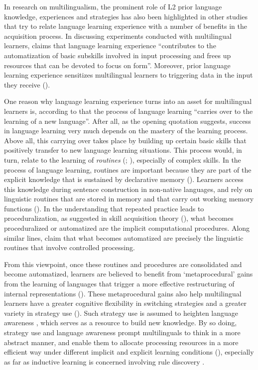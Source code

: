 \documentclass[output=paper,colorlinks,citecolor=brown,nonflat]{langsci/langscibook}
\begin{document}
In research on multilingualism, the prominent role of L2 prior language knowledge, experiences and strategies has also been highlighted in other studies that try to relate language learning experience with a number of benefits in the acquisition process. In discussing experiments conducted with multilingual learners, \citet[35]{Sanz2000} claims that language learning experience “contributes to the automatization of basic subskills involved in input processing and frees up resources that can be devoted to focus on form”. Moreover, prior language learning experience sensitizes multilingual learners to triggering data in the input they receive (\citealt{Zobl1992, Klein1995}).

One reason why language learning experience turns into an asset for multilingual learners is, according to \citet[6]{McLaughlinNayak1989} that the process of language learning “carries over to the learning of a new language”. After all, as the opening quotation suggests, success in language learning very much depends on the mastery of the learning process. Above all, this carrying over takes place by building up certain basic skills that positively transfer to new language learning situations. This process would, in turn, relate to the learning of \textit{routines} (\citealt[360]{Jessner2008Knowledge}; \citealt[804]{RutgersEvans2017}), especially of complex skills. In the process of language learning, routines are important because they are part of the explicit knowledge that is sustained by declarative memory (\citealt{Paradis2009, SharwoodSmith2010, TagarelliEtAl2011}). Learners access this knowledge during sentence construction in non-native languages, and rely on linguistic routines that are stored in memory and that carry out working memory functions (\citealt{BaarsFranklin2003, SharwoodSmith2010}). In the understanding that repeated practice leads to proceduralization, as suggested in skill acquisition theory (\citealt{DeKeyser2007,DeKeyser2010}), what becomes proceduralized or automatized are the implicit computational procedures. Along similar lines, \citet{RutgersEvans2017} claim that what becomes automatized are precisely the linguistic routines that involve controlled processing.

From this viewpoint, once these routines and procedures are consolidated and become automatized, learners are believed to benefit from ‘metaprocedural’ gains from the learning of languages that trigger a more effective restructuring of internal representations (\citealt{McLaughlinNayak1989, NayakEtAl1990}). These metaprocedural gains also help multilingual learners have a greater cognitive flexibility in switching strategies and a greater variety in strategy use (\citealt{Missler2000, Kemp2007}). Such strategy use is assumed to heighten language awareness \citep{Thomas1992}, which serves as a resource to build new knowledge. By so doing, strategy use and language awareness prompt multilinguals to think in a more abstract manner, and enable them to allocate processing resources in a more efficient way under different implicit and explicit learning conditions (\citealt{NationMcLaughlin1986}), especially as far as inductive learning is concerned involving rule discovery \citep{NayakEtAl1990}.
\end{document}
